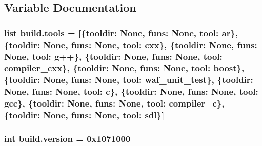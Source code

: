 \subsection{Variable Documentation}
\subsubsection[{\texorpdfstring{tools}{tools}}]{\setlength{\rightskip}{0pt plus 5cm}list build.\+tools = \mbox{[}\{\textquotesingle{}tooldir\textquotesingle{}\+: None, \textquotesingle{}funs\textquotesingle{}\+: None, \textquotesingle{}tool\textquotesingle{}\+: \textquotesingle{}ar\textquotesingle{}\}, \{\textquotesingle{}tooldir\textquotesingle{}\+: None, \textquotesingle{}funs\textquotesingle{}\+: None, \textquotesingle{}tool\textquotesingle{}\+: \textquotesingle{}cxx\textquotesingle{}\}, \{\textquotesingle{}tooldir\textquotesingle{}\+: None, \textquotesingle{}funs\textquotesingle{}\+: None, \textquotesingle{}tool\textquotesingle{}\+: \textquotesingle{}g++\textquotesingle{}\}, \{\textquotesingle{}tooldir\textquotesingle{}\+: None, \textquotesingle{}funs\textquotesingle{}\+: None, \textquotesingle{}tool\textquotesingle{}\+: \textquotesingle{}compiler\+\_\+cxx\textquotesingle{}\}, \{\textquotesingle{}tooldir\textquotesingle{}\+: None, \textquotesingle{}funs\textquotesingle{}\+: None, \textquotesingle{}tool\textquotesingle{}\+: \textquotesingle{}boost\textquotesingle{}\}, \{\textquotesingle{}tooldir\textquotesingle{}\+: None, \textquotesingle{}funs\textquotesingle{}\+: None, \textquotesingle{}tool\textquotesingle{}\+: \textquotesingle{}waf\+\_\+unit\+\_\+test\textquotesingle{}\}, \{\textquotesingle{}tooldir\textquotesingle{}\+: None, \textquotesingle{}funs\textquotesingle{}\+: None, \textquotesingle{}tool\textquotesingle{}\+: \textquotesingle{}c\textquotesingle{}\}, \{\textquotesingle{}tooldir\textquotesingle{}\+: None, \textquotesingle{}funs\textquotesingle{}\+: None, \textquotesingle{}tool\textquotesingle{}\+: \textquotesingle{}gcc\textquotesingle{}\}, \{\textquotesingle{}tooldir\textquotesingle{}\+: None, \textquotesingle{}funs\textquotesingle{}\+: None, \textquotesingle{}tool\textquotesingle{}\+: \textquotesingle{}compiler\+\_\+c\textquotesingle{}\}, \{\textquotesingle{}tooldir\textquotesingle{}\+: None, \textquotesingle{}funs\textquotesingle{}\+: None, \textquotesingle{}tool\textquotesingle{}\+: \textquotesingle{}sdl\textquotesingle{}\}\mbox{]}}\hypertarget{namespacebuild_a8d578fd8c3ff6abc23ecff7ba61fc3dd}{}\label{namespacebuild_a8d578fd8c3ff6abc23ecff7ba61fc3dd}
\subsubsection[{\texorpdfstring{version}{version}}]{\setlength{\rightskip}{0pt plus 5cm}int build.\+version = 0x1071000}\hypertarget{namespacebuild_a7f0275d8b2a512614212a6fc5e8c4b0a}{}\label{namespacebuild_a7f0275d8b2a512614212a6fc5e8c4b0a}
